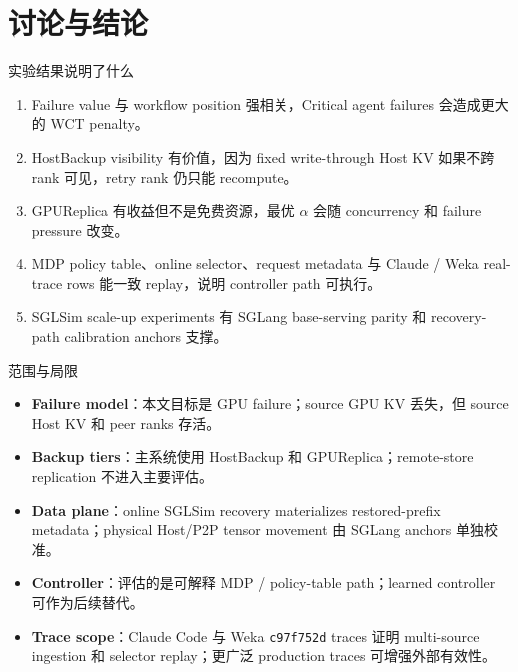 \documentclass[aspectratio=43]{beamer}
\newcommand{\tightitems}{\setlength{\itemsep}{2pt}\setlength{\parskip}{0pt}}
\newcommand{\Critical}{Critical}
\newcommand{\HostBackup}{HostBackup}
\newcommand{\GPUReplica}{GPUReplica}
\newcommand{\code}[1]{\texttt{\footnotesize #1}}
\begin{document}
\section{讨论与结论}

\begin{frame}{实验结果说明了什么}
  \small
  \begin{enumerate}
    \tightitems
    \item Failure value 与 workflow position 强相关，\Critical{} agent failures 会造成更大的 WCT penalty。
    \item HostBackup visibility 有价值，因为 fixed write-through Host KV 如果不跨 rank 可见，retry rank 仍只能 recompute。
    \item GPUReplica 有收益但不是免费资源，最优 $\alpha$ 会随 concurrency 和 failure pressure 改变。
    \item MDP policy table、online selector、request metadata 与 Claude / Weka real-trace rows 能一致 replay，说明 controller path 可执行。
    \item SGLSim scale-up experiments 有 SGLang base-serving parity 和 recovery-path calibration anchors 支撑。
  \end{enumerate}
\end{frame}

\begin{frame}{范围与局限}
  \small
  \begin{itemize}
    \tightitems
    \item \textbf{Failure model}：本文目标是 GPU failure；source GPU KV 丢失，但 source Host KV 和 peer ranks 存活。
    \item \textbf{Backup tiers}：主系统使用 \HostBackup{} 和 \GPUReplica{}；remote-store replication 不进入主要评估。
    \item \textbf{Data plane}：online SGLSim recovery materializes restored-prefix metadata；physical Host/P2P tensor movement 由 SGLang anchors 单独校准。
    \item \textbf{Controller}：评估的是可解释 MDP / policy-table path；learned controller 可作为后续替代。
    \item \textbf{Trace scope}：Claude Code 与 Weka \code{c97f752d} traces 证明 multi-source ingestion 和 selector replay；更广泛 production traces 可增强外部有效性。
  \end{itemize}
\end{frame}
\end{document}
